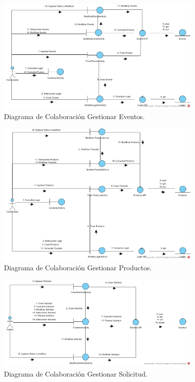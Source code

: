 \documentclass[12pt,letterpaper,openany]{book}
\begin{document}
\begin{figure}[H]
\begin{center}
\includegraphics[width=10cm]{./imagenes/DC/DC_gestionar_evento}
\caption{Diagrama de Colaboración Gestionar Eventos.}
\end{center}
\end{figure}

\begin{figure}[H]
\begin{center}
\includegraphics[width=10cm]{./imagenes/DC/DC_gestionar_producto}
\caption{Diagrama de Colaboración Gestionar Productos.}
\end{center}
\end{figure}

\begin{figure}[H]
\begin{center}
\includegraphics[width=10cm]{./imagenes/DC/DC_gestionar_solicitud}
\caption{Diagrama de Colaboración Gestionar Solicitud.}
\end{center}
\end{figure}
\end{document}
